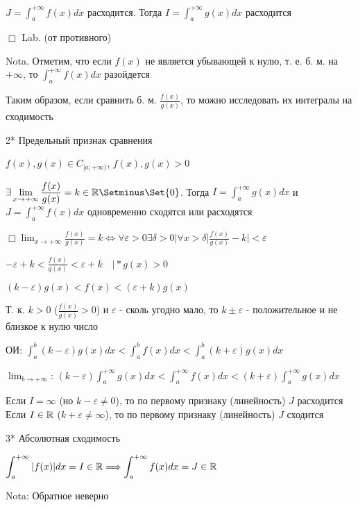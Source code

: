 \documentclass[12pt]{article}
\begin{document}
    $\displaystyle J = \int^{+\infty}_{a} f(x) dx \text{  расходится. Тогда  } I = \int^{+\infty}_{a} g(x) dx \text{  расходится}$

    $\Box$ Lab. (от противного)

    Nota. Отметим, что если $f(x)$ не является убывающей к нулю, т. е. б. м. на $+\infty$, то $\displaystyle \int^{+\infty}_{a} f(x) dx$ разойдется

    Таким образом, если сравнить б. м. $\displaystyle \frac{f(x)}{g(x)}$, то можно исследовать их интегралы на сходимость

    2* Предельный признак сравнения

    $f(x), g(x) \in C_{[a;+\infty)}$, $f(x), g(x) > 0$

    $\displaystyle \exists \lim_{x\to+\infty} \frac{f(x)}{g(x)} = k \in \Real \Setminus \Set{0}$.
    Тогда $\displaystyle I = \int^{+\infty}_{a} g(x)dx$ и $\displaystyle J = \int^{+\infty}_{a} f(x)dx$ одновременно сходятся или расходятся

    $\displaystyle \Box \lim_{x\to+\infty} \frac{f(x)}{g(x)} = k \Longleftrightarrow \forall \varepsilon > 0 \exists \delta > 0 | \forall x > \delta |\frac{f(x)}{g(x)} - k| < \varepsilon $

    $\displaystyle -\varepsilon + k < \frac{f(x)}{g(x)} < \varepsilon + k \quad \Big| * g(x) > 0$

    $\displaystyle (k - \varepsilon)g(x) < f(x) < (\varepsilon + k)g(x)$

    Т. к. $k > 0$ ($\frac{f(x)}{g(x)} > 0$) и $\varepsilon$ - сколь угодно мало, то $k \pm \varepsilon$ - положительное и не близкое к нулю число

    ОИ: $\displaystyle \int^{b}_{a} (k - \varepsilon)g(x) dx < \int^{b}_{a} f(x) dx < \int^{b}_{a} (k + \varepsilon)g(x) dx$

    $\displaystyle \lim_{b \to +\infty}$: $\displaystyle (k - \varepsilon) \int^{+\infty}_{a} g(x) dx < \int^{+\infty}_{a} f(x) dx < (k + \varepsilon) \int^{+\infty}_{a} g(x) dx$

    Если $I = \infty$ (но $k - \varepsilon \neq 0$), то по первому признаку (линейность) $J$ расходится
    Если $I \in \mathbb{R}$ ($k + \varepsilon \neq \infty$), то по первому признаку (линейность) $J$ сходится

    3* Абсолютная сходимость

    $\displaystyle \int^{+\infty}_{a} |f(x)| dx = I \in \mathbb{R} \Longrightarrow \int^{+\infty}_{a} f(x) dx = J \in \mathbb{R}$

    Nota: Обратное неверно
\end{document}
